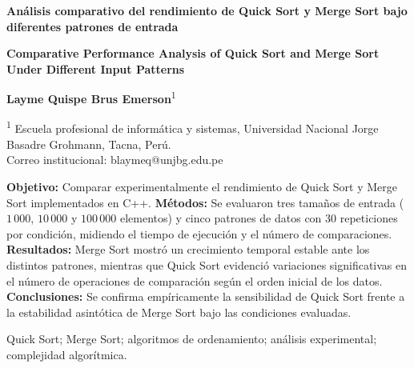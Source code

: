 \begin{center}
{\fontsize{16}{19}\selectfont\bfseries
Análisis comparativo del rendimiento de Quick Sort y Merge Sort bajo diferentes patrones de entrada\par}

\vspace{0.25cm}

{\fontsize{14}{17}\selectfont\bfseries
Comparative Performance Analysis of Quick Sort and Merge Sort Under Different Input Patterns\par}

\vspace{0.5cm}

{\fontsize{12}{14}\selectfont
\textbf{Layme Quispe Brus Emerson}\textsuperscript{1}\par
\vspace{0.1cm}
{\small
\textsuperscript{1} Escuela profesional de informática y sistemas,
Universidad Nacional Jorge Basadre Grohmann, Tacna, Perú.\\
Correo institucional: blaymeq@unjbg.edu.pe\\
}
}
\end{center}

\vspace{0.2cm}

{\fontsize{11}{13}\selectfont
\textbf{Objetivo:} Comparar experimentalmente el rendimiento de Quick Sort y Merge Sort implementados en C++. \textbf{Métodos:} Se evaluaron tres tamaños de entrada ($1\,000$, $10\,000$ y $100\,000$ elementos) y cinco patrones de datos con 30 repeticiones por condición, midiendo el tiempo de ejecución y el número de comparaciones. \textbf{Resultados:} Merge Sort mostró un crecimiento temporal estable ante los distintos patrones, mientras que Quick Sort evidenció variaciones significativas en el número de operaciones de comparación según el orden inicial de los datos. \textbf{Conclusiones:} Se confirma empíricamente la sensibilidad de Quick Sort frente a la estabilidad asintótica de Merge Sort bajo las condiciones evaluadas.
\par}

\vspace{0.15cm}
{\fontsize{11}{13}\selectfont Quick Sort; Merge Sort; algoritmos de ordenamiento; análisis experimental; complejidad algorítmica.\par}

\vspace{0.3cm}

